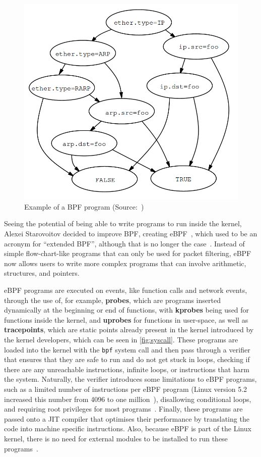 \begin{figure}[htb]
   \centering
   \includegraphics[scale=.3]{bpfprog}
   \caption{Example of a BPF program (Source:~\cite{bpf})}\label{fig:bpfprog}
\end{figure}

Seeing the potential of being able to write programs to run inside the kernel,
Alexei Starovoitov decided to improve \ac{BPF}, creating eBPF~\cite{alexei},
which used to be an acronym for ``extended BPF'', although that is no longer the
case~\cite{ebpfio}. Instead of simple flow-chart-like programs that can only be
used for packet filtering, eBPF now allows users to write more complex programs
that can involve arithmetic, structures, and pointers.

eBPF programs are executed on events, like function calls and network events,
through the use of, for example, \textbf{probes}, which are programs inserted
dynamically at the beginning or end of functions, with \textbf{kprobes} being
used for functions inside the kernel, and \textbf{uprobes} for functions in
user-space, as well as \textbf{tracepoints}, which are static points already
present in the kernel introduced by the kernel developers, which can be seen in
\autoref{fig:syscall}. These programs are loaded into the kernel with the
\texttt{bpf} system call and then pass through a verifier that ensures that they
are safe to run and do not get stuck in loops, checking if there are any
unreachable instructions, infinite loops, or instructions that harm the system.
Naturally, the verifier introduces some limitations to eBPF programs, such as a
limited number of instructions per eBPF program (Linux version 5.2 increased
this number from 4096 to one million~\cite{sizelimit}), disallowing conditional
loops, and requiring root privileges for most programs~\cite{lwm}. Finally,
these programs are passed onto a \ac{JIT} compiler that optimises their
performance by translating the code into machine specific instructions. Also,
because eBPF is part of the Linux kernel, there is no need for external modules
to be installed to run these programs~\cite{ebpfio}.


